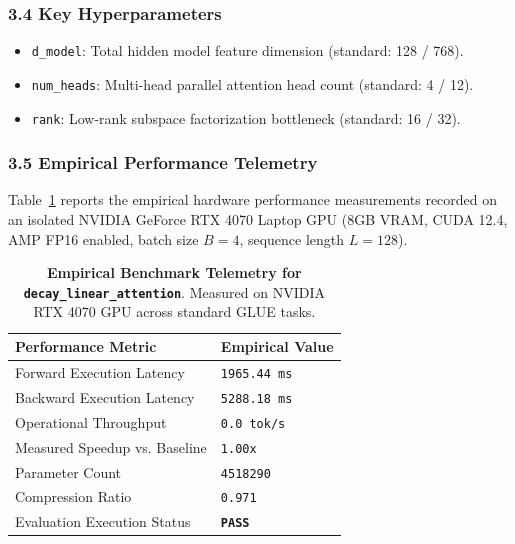 \subsubsection*{3.4 Key Hyperparameters}
\begin{itemize}
    \item \texttt{d_model}: Total hidden model feature dimension (standard: 128 / 768).
    \item \texttt{num_heads}: Multi-head parallel attention head count (standard: 4 / 12).
    \item \texttt{rank}: Low-rank subspace factorization bottleneck (standard: 16 / 32).
\end{itemize}

\subsubsection*{3.5 Empirical Performance Telemetry}
Table~\ref{tab:telemetry_decay\_linear\_attention} reports the empirical hardware performance measurements recorded on an isolated NVIDIA GeForce RTX 4070 Laptop GPU (8GB VRAM, CUDA 12.4, AMP FP16 enabled, batch size $B=4$, sequence length $L=128$).

\begin{table}[h]
\centering
\small
\caption{\textbf{Empirical Benchmark Telemetry for \texttt{decay\_linear\_attention}}. Measured on NVIDIA RTX 4070 GPU across standard GLUE tasks.}
\label{tab:telemetry_decay\_linear\_attention}
\begin{tabularx}{\columnwidth}{lX}
\toprule
\textbf{Performance Metric} & \textbf{Empirical Value} \\
\midrule
Forward Execution Latency & \texttt{1965.44 ms} \\
Backward Execution Latency & \texttt{5288.18 ms} \\
Operational Throughput & \texttt{0.0 tok/s} \\
Measured Speedup vs. Baseline & \texttt{1.00x} \\
Parameter Count & \texttt{4518290} \\
Compression Ratio & \texttt{0.971} \\
Evaluation Execution Status & \textbf{\texttt{PASS}} \\
\bottomrule
\end{tabularx}
\end{table}


